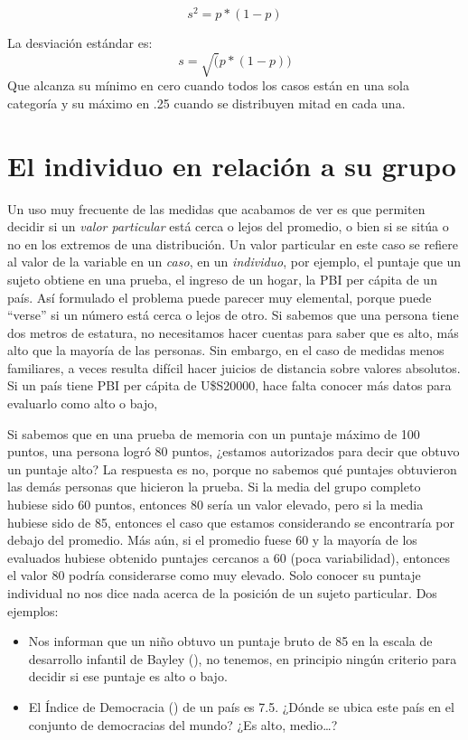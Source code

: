 \documentclass[]{book}
\begin{document}
\[s^2 = p*(1-p)\]

La desviación estándar es: \[s=\sqrt(p*(1-p))\]
Que alcanza su mínimo en cero cuando todos los casos están en una sola categoría y su máximo en .25 cuando se distribuyen mitad en cada una.

\hypertarget{el-individuo-en-relacion-a-su-grupo}{%
\section{El individuo en relación a su grupo}\label{el-individuo-en-relacion-a-su-grupo}}

Un uso muy frecuente de las medidas que acabamos de ver es que permiten decidir si un \emph{valor particular} está cerca o lejos del promedio, o bien si se sitúa o no en los extremos de una distribución. Un valor particular en este caso se
refiere al valor de la variable en un \emph{caso}, en un \emph{individuo}, por
ejemplo, el puntaje que un sujeto obtiene en una prueba, el ingreso de un hogar, la PBI per cápita de un país. Así formulado
el problema puede parecer muy elemental, porque puede ``verse'' si un
número está cerca o lejos de otro. Si sabemos que una persona tiene dos metros de estatura, no necesitamos hacer cuentas para saber que es alto, más alto que la mayoría de las personas. Sin embargo, en el caso de medidas menos familiares, a veces resulta difícil hacer juicios de distancia sobre valores absolutos. Si un país tiene PBI per cápita de U\$S20000, hace falta conocer más datos para evaluarlo como alto o bajo,

Si sabemos que en una prueba de memoria con un puntaje máximo de 100
puntos, una persona logró 80 puntos, ¿estamos autorizados para decir que obtuvo un puntaje alto? La respuesta es no, porque no sabemos qué
puntajes obtuvieron las demás personas que hicieron la prueba. Si la
media del grupo completo hubiese sido 60 puntos, entonces 80 sería un
valor elevado, pero si la media hubiese sido de 85, entonces el caso que estamos considerando se encontraría por debajo del promedio. Más aún, si el promedio fuese 60 y la mayoría de los evaluados hubiese obtenido puntajes cercanos a 60 (poca variabilidad), entonces el valor 80 podría considerarse como muy elevado. Solo conocer su puntaje individual no nos dice nada acerca de la posición de un sujeto particular. Dos ejemplos:

\begin{itemize}
\item
  Nos informan que un niño obtuvo un puntaje bruto de 85 en
  la escala de desarrollo infantil de Bayley (\citet{Ballot2017}), no tenemos, en principio ningún criterio para decidir si ese puntaje es alto o bajo.
\item
  El Índice de Democracia (\citet{demindex2011}) de un país es 7.5. ¿Dónde se ubica este país en el conjunto de democracias del mundo? ¿Es alto, medio\ldots{}?
\end{itemize}
\end{document}
